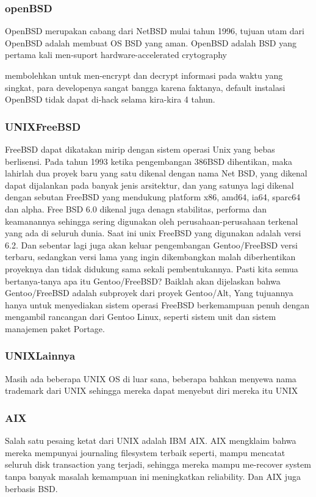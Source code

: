 \subsubsection{openBSD}
	OpenBSD merupakan cabang dari NetBSD mulai tahun  1996, tujuan utam dari OpenBSD adalah membuat OS BSD yang aman. 
	OpenBSD adalah BSD yang pertama kali men-suport hardware-accelerated crytography {membolehkan untuk men-encrypt dan decrypt informasi pada waktu yang singkat, para developenya sangat bangga karena faktanya, default instalasi OpenBSD tidak dapat di-hack selama kira-kira 4 tahun.
\subsubsection{UNIXFreeBSD}
	FreeBSD dapat dikatakan mirip dengan sistem operasi Unix yang bebas {berlisensi}. Pada tahun 1993 ketika pengembangan 386BSD dihentikan, maka lahirlah dua proyek baru yang satu dikenal dengan nama Net BSD, yang dikenal dapat dijalankan pada banyak jenis arsitektur, 
	dan yang satunya lagi dikenal dengan sebutan FreeBSD yang mendukung platform x86, amd64, ia64, sparc64 dan alpha. 
	Free BSD 6.0 dikenal juga denagn stabilitas, performa dan keamanannya sehingga sering digunakan oleh perusahaan-perusahaan terkenal yang ada di seluruh dunia. 
	Saat ini unix FreeBSD yang digunakan adalah versi 6.2. Dan sebentar lagi juga akan keluar pengembangan  Gentoo/FreeBSD versi terbaru, sedangkan versi lama yang ingin dikembangkan malah diberhentikan proyeknya dan tidak didukung sama sekali pembentukannya. 
	Pasti kita semua bertanya-tanya apa itu Gentoo/FreeBSD? Baiklah akan dijelaskan bahwa Gentoo/FreeBSD adalah subproyek dari proyek Gentoo/Alt, Yang tujuannya hanya untuk menyediakan sistem operasi FreeBSD berkemampuan penuh dengan mengambil rancangan dari Gentoo Linux, seperti sistem unit dan sistem manajemen paket Portage.
\subsubsection{UNIXLainnya}
	Masih ada beberapa UNIX OS di luar sana, beberapa bahkan menyewa nama trademark dari UNIX sehingga mereka dapat menyebut diri mereka itu UNIX
\subsubsection{AIX}
	Salah satu pesaing ketat dari UNIX adalah IBM AIX. AIX mengklaim bahwa mereka mempunyai journaling filesystem terbaik seperti, mampu mencatat seluruh disk transaction yang terjadi, sehingga mereka mampu me-recover system tanpa banyak masalah kemampuan ini meningkatkan reliability. 
	Dan AIX juga berbasis BSD.
}
